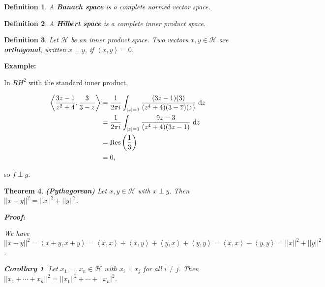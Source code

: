 \documentclass{article}
\theoremstyle{colontheorem}
\newtheorem{theorem}{Theorem}[section]
\newtheorem{definition}[theorem]{Definition}
\newtheorem{corollary}{Corollary}[theorem]
\newcommand{\Res}{\textnormal{Res}}
\newenvironment{Theorem}
{
	\begin{mdframed}[backgroundcolor=TheoremOrange!10]
	\begin{theorem}
}
{
	\end{theorem}
	\end{mdframed}
	
	\vspace{.15in}
}
\newenvironment{Def}
{
	\begin{mdframed}[backgroundcolor=DefGreen!10]
	\begin{definition}
}
{
	\end{definition}
	\end{mdframed}
	
	\vspace{.15in}
}
\newenvironment{Corollary}
{
	\begin{mdframed}[backgroundcolor=CorollaryBlue!10]
	\begin{corollary}
}
{
	\end{corollary}
	\end{mdframed}
	
	\vspace{.09in}
}
\newenvironment{Proof}
{
	\begin{mdframed}[backgroundcolor=ProofPurple!10]
	\textbf{Proof:}%
}
{
	\end{mdframed}
	
	\vspace{.085in}
}
\newenvironment{Example}
{
	\begin{mdframed}
	\textbf{Example:}%
}
{
	\end{mdframed}
	
	\vspace{.15in}
}
\begin{document}
\begin{Def}
	
	A \textbf{Banach space} is a complete normed vector space.
	
\end{Def}



\begin{Def}
	
	A \textbf{Hilbert space} is a complete inner product space.
	
\end{Def}



\begin{Def}
	
	Let $\mathcal{H}$ be an inner product space. Two vectors $x, y \in \mathcal{H}$ are \textbf{orthogonal}, written $x \perp y$, if $\left< x, y \right> = 0$.
	
\end{Def}



\begin{Example}
	In $RH^2$ with the standard inner product,
	
	\begin{align*}
		\left< \frac{3z - 1}{z^2 + 4}, \frac{3}{3 - z} \right> &= \frac{1}{2 \pi i} \int_{|z| = 1} \frac{(3z - 1)(3)}{(z^4 + 4)(3 - \overline{z})(z)}\ \textnormal{d}z\\
		&= \frac{1}{2 \pi i} \int_{|z| = 1} \frac{9z - 3}{(z^4 + 4)(3z - 1)}\ \textnormal{d}z\\
		&= \Res \left( \frac{1}{3} \right)\\
		&= 0 \textnormal{,}
	\end{align*}
	
	so $f \perp g$.
	
\end{Example}



\begin{Theorem}
	
	\textbf{(Pythagorean)} Let $x, y \in \mathcal{H}$ with $x \perp y$. Then $||x + y||^2 = ||x||^2+ ||y||^2$.
	
	\begin{Proof}
		We have $||x + y||^2 = \left< x + y, x + y \right> = \left< x, x \right> + \left< x, y \right> + \left< y, x \right> + \left< y, y \right> = \left< x, x \right> + \left< y, y \right> = ||x||^2 + ||y||^2$.
		
	\end{Proof}
	
	\begin{Corollary}
		
		Let $x_1, ..., x_n \in \mathcal{H}$ with $x_i \perp x_j$ for all $i \neq j$. Then $||x_1 + \cdots + x_n||^2 = ||x_1||^2 + \cdots + ||x_n|^2$.
		
	\end{Corollary}
	
\end{Theorem}
\end{document}
